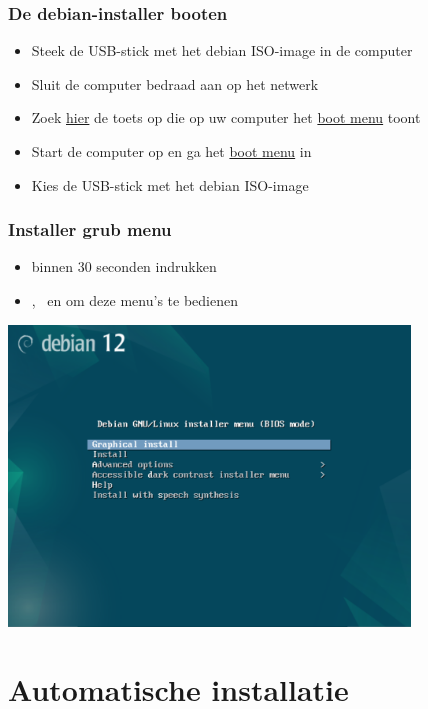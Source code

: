 \documentclass{beamer}
\begin{document}
\begin{frame}
  \frametitle{De \textbf{debian-installer} booten}
  \begin{itemize}
    \item Steek de USB-stick met het debian ISO-image in de computer
    \item Sluit de computer bedraad aan op het netwerk
    \item Zoek \href{https://www.boot-disk.com/quest_bootmenu.htm}{hier} de toets op die op uw computer het \href{https://www.boot-disk.com/quest_bootmenu.htm}{boot menu} toont
    \item Start de computer op en ga het \href{https://www.boot-disk.com/quest_bootmenu.htm}{boot menu} in
    \item Kies de USB-stick met het debian ISO-image
  \end{itemize}

\end{frame}


\begin{frame}
  \frametitle{Installer grub menu}
  \begin{itemize}
    \item binnen 30 seconden \DArrow indrukken
    \item \DArrow, \UArrow\  en \Enter om deze menu's te bedienen
  \end{itemize}
  
  \centering
  \includegraphics[width=0.8\textwidth]{img/installer-grub-menu.png}
\end{frame}

\section{Automatische installatie}
\end{document}
